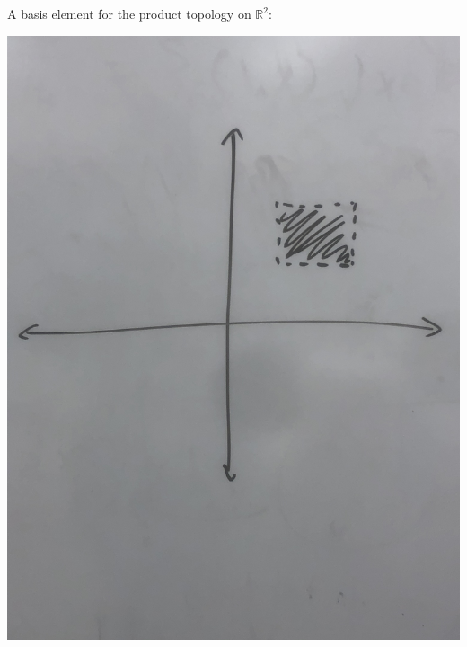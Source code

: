 \documentclass{article}
\newcommand{\R}{\mathbb R}
\begin{document}
\begin{center}
A basis element for the product topology on $\R^2$:

\includegraphics[scale=.05]{IMG-0795.jpg}
\end{center}
\end{document}
